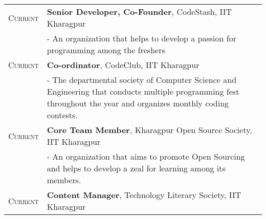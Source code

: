 \documentclass[a4paper,10pt]{extarticle} %
\begin{document}
\begin{tabular}{r|p{17.5cm}}
\textsc{Current} & \textbf{Senior Developer, Co-Founder}, CodeStash, IIT Kharagpur \\
& - \space An organization that helps to develop a passion for programming among the freshers\\
\textsc{Current} & \textbf{Co-ordinator}, CodeClub, IIT Kharagpur \\
& - \space The departmental society of Computer Science and Engineering that conducts multiple programming fest throughout the year and organizes monthly coding contests. \\
\textsc{Current} & \textbf{Core Team Member}, Kharagpur Open Source Society, IIT Kharagpur \\
& - \space An organization that aims to promote Open Sourcing and helps to develop a zeal for learning among its members. \\
\textsc{Current} & \textbf{Content Manager}, Technology Literary Society, IIT Kharagpur \\
\end{tabular}



\end{document}
